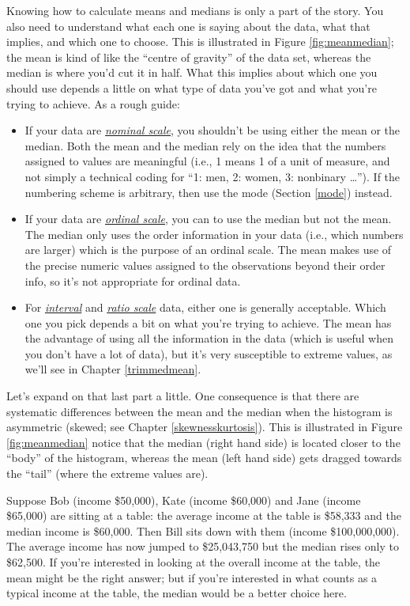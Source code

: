 \documentclass[
  11pt,
  a4paper,
  twoside,symmetric,openright]{book}
\providecommand{\tightlist}{%
  \setlength{\itemsep}{0pt}\setlength{\parskip}{0pt}}
\theoremstyle{break}
\theoremstyle{break}
\begin{document}
Knowing how to calculate means and medians is only a part of the story. You also need to understand what each one is saying about the data, what that implies, and which one to choose. This is illustrated in Figure \ref{fig:meanmedian}; the mean is kind of like the ``centre of gravity'' of the data set, whereas the median is where you'd cut it in half. What this implies about which one you should use depends a little on what type of data you've got and what you're trying to achieve. As a rough guide:

\begin{itemize}
\tightlist
\item
  If your data are \emph{\hyperref[nominalscale]{nominal scale}}, you shouldn't be using either the mean or the median. Both the mean and the median rely on the idea that the numbers assigned to values are meaningful (i.e., 1 means 1 of a unit of measure, and not simply a technical coding for ``1: men, 2: women, 3: nonbinary \ldots{}''). If the numbering scheme is arbitrary, then use the mode (Section \ref{mode}) instead.
\item
  If your data are \emph{\hyperref[ordinalscale]{ordinal scale}}, you can to use the median but not the mean. The median only uses the order information in your data (i.e., which numbers are larger) which is the purpose of an ordinal scale. The mean makes use of the precise numeric values assigned to the observations beyond their order info, so it's not appropriate for ordinal data.
\item
  For \emph{\hyperref[intervalscale]{interval}} and \emph{\hyperref[ratioscale]{ratio scale}} data, either one is generally acceptable. Which one you pick depends a bit on what you're trying to achieve. The mean has the advantage of using all the information in the data (which is useful when you don't have a lot of data), but it's very susceptible to extreme values, as we'll see in Chapter \ref{trimmedmean}.
\end{itemize}

Let's expand on that last part a little. One consequence is that there are systematic differences between the mean and the median when the histogram is asymmetric (skewed; see Chapter \ref{skewnesskurtosis}). This is illustrated in Figure \ref{fig:meanmedian} notice that the median (right hand side) is located closer to the ``body'' of the histogram, whereas the mean (left hand side) gets dragged towards the ``tail'' (where the extreme values are).

\begin{example}
\protect\hypertarget{exm:exmeanmedian}{}\label{exm:exmeanmedian}Suppose Bob (income \$50,000), Kate (income \$60,000) and Jane (income \$65,000) are sitting at a table: the average income at the table is \$58,333 and the median income is \$60,000. Then Bill sits down with them (income \$100,000,000). The average income has now jumped to \$25,043,750 but the median rises only to \$62,500. If you're interested in looking at the overall income at the table, the mean might be the right answer; but if you're interested in what counts as a typical income at the table, the median would be a better choice here.
\end{example}
\end{document}
